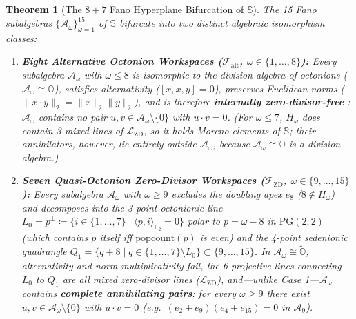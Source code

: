 \documentclass[11pt,a4paper]{article}
\newtheorem{theorem}{Theorem}[section]
\theoremstyle{definition}
\theoremstyle{remark}
\newcommand{\Oc}{\mathbb{O}}
\newcommand{\Se}{\mathbb{S}}
\newcommand{\Ftwo}{\mathbb{F}_2}
\newcommand{\PG}{\mathrm{PG}}
\newcommand{\Falt}{\mathcal{F}_{\mathrm{alt}}}
\newcommand{\Fzd}{\mathcal{F}_{\mathrm{ZD}}}
\newcommand{\popcount}{\mathrm{popcount}}
\begin{document}
\begin{theorem}[The $8+7$ Fano Hyperplane Bifurcation of $\Se$]
\label{thm:fano_bifurcation}
The 15 Fano subalgebras $\{\mathcal{A}_\omega\}_{\omega=1}^{15}$ of $\Se$ bifurcate into two distinct algebraic isomorphism classes:
\begin{enumerate}
    \item \textbf{Eight Alternative Octonion Workspaces ($\Falt$, $\omega \in \{1, \dots, 8\}$):} Every subalgebra $\mathcal{A}_\omega$ with $\omega \le 8$ is isomorphic to the division algebra of octonions ($\mathcal{A}_\omega \cong \Oc$), satisfies alternativity ($[x, x, y] = 0$), preserves Euclidean norms ($\|x \cdot y\|_2 = \|x\|_2 \|y\|_2$), and is therefore \textbf{internally zero-divisor-free} \cite{Agourakis2026b}: $\mathcal{A}_\omega$ contains no pair $u, v \in \mathcal{A}_\omega \setminus \{0\}$ with $u \cdot v = 0$. (For $\omega \le 7$, $H_\omega$ does contain 3 mixed lines of $\mathcal{L}_{\mathrm{ZD}}$, so it holds Moreno elements of $\Se$; their annihilators, however, lie entirely outside $\mathcal{A}_\omega$, because $\mathcal{A}_\omega \cong \Oc$ is a division algebra.)
    \item \textbf{Seven Quasi-Octonion Zero-Divisor Workspaces ($\Fzd$, $\omega \in \{9, \dots, 15\}$):} Every subalgebra $\mathcal{A}_\omega$ with $\omega \ge 9$ excludes the doubling apex $e_8$ ($8 \notin H_\omega$) and decomposes into the 3-point octonionic line $L_0 = p^{\perp} \coloneqq \{ i \in \{1,\dots,7\} \mid \langle p, i \rangle_{\Ftwo} = 0 \}$ polar to $p = \omega - 8$ in $\PG(2,2)$ (which contains $p$ itself iff $\popcount(p)$ is even) and the 4-point sedenionic quadrangle $Q_1 = \{q+8 \mid q \in \{1, \dots, 7\} \setminus L_0\} \subset \{9, \dots, 15\}$. In $\mathcal{A}_\omega \cong \tilde{\Oc}$, alternativity and norm multiplicativity fail, the 6 projective lines connecting $L_0$ to $Q_1$ are all mixed zero-divisor lines ($\mathcal{L}_{\mathrm{ZD}}$), and---unlike Case 1---$\mathcal{A}_\omega$ contains \textbf{complete annihilating pairs}: for every $\omega \ge 9$ there exist $u, v \in \mathcal{A}_\omega \setminus \{0\}$ with $u \cdot v = 0$ (e.g.\ $(e_2 + e_9)(e_4 + e_{15}) = 0$ in $\mathcal{A}_9$).
\end{enumerate}
\end{theorem}
\end{document}
